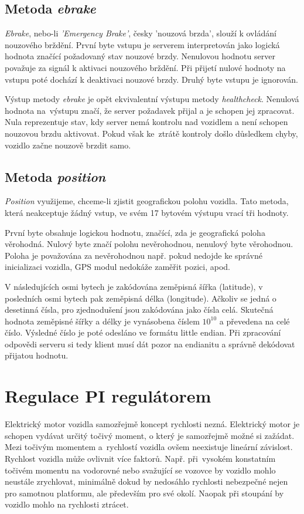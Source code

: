 \documentclass[czech, bachelor]{diploma}
\begin{document}
\subsection{Metoda \emph{ebrake}}
\emph{Ebrake}, nebo-li \emph{'Emergency Brake'}, česky 'nouzová brzda', slouží k ovládání nouzového brždění. První byte vstupu
je serverem interpretován jako logická hodnota značící požadovaný stav nouzové brzdy. Nenulovou hodnotu server považuje za signál
k aktivaci nouzového brždění. Při přijetí nulové hodnoty na vstupu poté dochází k deaktivaci nouzové brzdy. Druhý byte vstupu
je ignorován.

Výstup metody \emph{ebrake} je opět ekvivalentní výstupu metody \emph{healthcheck}. Nenulová hodnota na~výstupu značí, že server
požadavek přijal a je schopen jej zpracovat. Nula reprezentuje stav, kdy server nemá kontrolu nad vozidlem a není schopen
nouzovou brzdu aktivovat. Pokud však ke~ztrátě kontroly došlo důsledkem chyby, vozidlo začne nouzově brzdit samo.

\subsection{Metoda \emph{position}}

\emph{Position} využijeme, chceme-li zjistit geografickou polohu vozidla. Tato metoda, která neakceptuje žádný vstup, ve svém
17 bytovém výstupu vrací tři hodnoty.

První byte obsahuje logickou hodnotu, značící, zda je geografická poloha věrohodná. Nulový byte značí polohu nevěrohodnou,
nenulový byte věrohodnou. Poloha je považována za nevěrohodnou např. pokud nedojde ke správné inicializaci vozidla, GPS modul
nedokáže zaměřit pozici, apod.

V následujících osmi bytech je zakódována zeměpisná šířka (latitude), v posledních osmi bytech pak zeměpisná délka (longitude).
Ačkoliv se jedná o desetinná čísla, pro zjednodušení jsou zakódována jako čísla celá. Skutečná hodnota zeměpisné šířky a délky
je vynásobena číslem $10^{10}$ a převedena na celé číslo. Výsledné číslo je poté odesláno ve formátu little endian. Při zpracování
odpovědi serveru si tedy klient musí dát pozor na endianitu a správně dekódovat přijatou hodnotu.

\section{Regulace PI regulátorem} \label{pi-controller}
Elektrický motor vozidla samozřejmě koncept rychlosti nezná. Elektrický motor je schopen vydávat určitý točivý moment, o který
je samozřejmě možné si zažádat. Mezi točivým momentem a~rychlostí vozidla ovšem neexistuje lineární závislost. Rychlost vozidla
může ovlivnit více faktorů. Např. při~vysokém konstatním točivém momentu na vodorovné nebo svažující se vozovce by vozidlo mohlo
neustále zrychlovat, minimálně dokud by nedosáhlo rychlosti nebezpečné nejen pro samotnou platformu, ale především pro své okolí.
Naopak při stoupání by vozidlo mohlo na rychlosti ztrácet.
\end{document}
